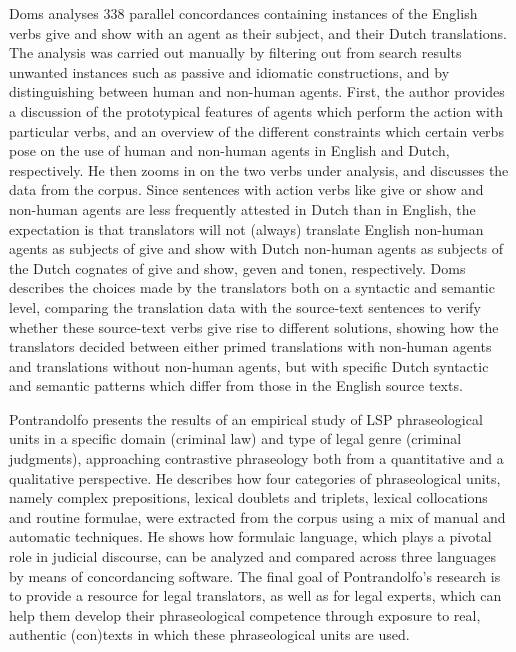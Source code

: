 \begin{refsection}
Doms analyses 338 parallel concordances containing instances of the English verbs give and show with an agent as their subject, and their Dutch translations. The analysis was carried out manually by filtering out from search results unwanted instances such as passive and idiomatic constructions, and by distinguishing between human and non-human agents. First, the author provides a discussion of the prototypical features of agents which perform the action with particular verbs, and an overview of the different constraints which certain verbs pose on the use of human and non-human agents in English and Dutch, respectively. He then zooms in on the two verbs under analysis, and discusses the data from the corpus. Since sentences with action verbs like give or show and non-human agents are less frequently attested in Dutch than in English, the expectation is that translators will not (always) translate English non-human agents as subjects of give and show with Dutch non-human agents as subjects of the Dutch cognates of give and show, geven and tonen, respectively. Doms describes the choices made by the translators both on a syntactic and semantic level, comparing the translation data with the source-text sentences to verify whether these source-text verbs give rise to different solutions, showing how the translators decided between either primed translations with non-human agents and translations without non-human agents, but with specific Dutch syntactic and semantic patterns which differ from those in the English source texts.

Pontrandolfo presents the results of an empirical study of LSP phraseological units in a specific domain (criminal law) and type of legal genre (criminal judgments), approaching contrastive phraseology both from a quantitative and a qualitative perspective. He describes how four categories of phraseological units, namely complex prepositions, lexical doublets and triplets, lexical collocations and routine formulae, were extracted from the corpus using a mix of manual and automatic techniques. He shows how formulaic language, which plays a pivotal role in judicial discourse, can be analyzed and compared across three languages by means of concordancing software. The final goal of Pontrandolfo’s research is to provide a resource for legal translators, as well as for legal experts, which can help them develop their phraseological competence through exposure to real, authentic (con)texts in which these phraseological units are used.


\end{refsection}
